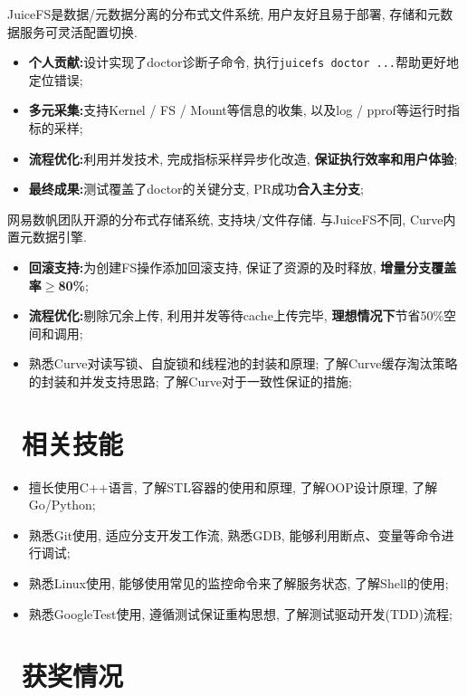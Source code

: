 \documentclass{resume}
\begin{document}
JuiceFS是数据/元数据分离的分布式文件系统, 用户友好且易于部署, 存储和元数据服务可灵活配置切换.
\begin{itemize}[parsep=0.3ex]
  \item \textbf{个人贡献:}设计实现了doctor诊断子命令, 执行\verb|juicefs doctor ...|帮助更好地定位错误;
  \item \textbf{多元采集:}支持Kernel / FS / Mount等信息的收集, 以及log / pprof等运行时指标的采样;
  \item \textbf{流程优化:}利用并发技术, 完成指标采样异步化改造, \textbf{保证执行效率和用户体验};
  \item \textbf{最终成果:}测试覆盖了doctor的关键分支, PR成功\textbf{合入主分支};\enspace{}
\end{itemize}
网易数帆团队开源的分布式存储系统, 支持块/文件存储. 与JuiceFS不同, Curve内置元数据引擎.
\begin{itemize}[parsep=0.3ex]
  \item \textbf{回滚支持:}为创建FS操作添加回滚支持, 保证了资源的及时释放, \textbf{增量分支覆盖率$\geq$80\%};\enspace{}
  \item \textbf{流程优化:}剔除冗余上传, 利用并发等待cache上传完毕, \textbf{理想情况下}节省50\%空间和调用;\enspace{}
  \item 熟悉Curve对读写锁、自旋锁和线程池的封装和原理; 了解Curve缓存淘汰策略的封装和并发支持思路; 了解Curve对于一致性保证的措施;
\end{itemize}
\section{\faCogs\ 相关技能}
\begin{itemize}[parsep=0.3ex]
  \item 擅长使用C++语言, 了解STL容器的使用和原理, 了解OOP设计原理, 了解Go/Python;
  \item 熟悉Git使用, 适应分支开发工作流, 熟悉GDB, 能够利用断点、变量等命令进行调试;
  \item 熟悉Linux使用, 能够使用常见的监控命令来了解服务状态, 了解Shell的使用;
  \item 熟悉GoogleTest使用, 遵循测试保证重构思想, 了解测试驱动开发(TDD)流程;
\end{itemize}
\section{\faHeartO\ 获奖情况}
\end{document}
